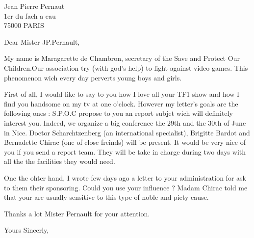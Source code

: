 \documentclass{letter}
\begin{document}
 
\begin{letter}{ Jean Pierre Pernaut \\ 1er du fach a eau  \\ 75000 PARIS}
\opening{Dear Mister JP.Pernault,}



My name is Maragarette de Chambron, secretary of the Save and Protect Our Children.Our association try (with god's help) to fight against video games.
This phenomenon wich every day perverts young boys and girls.

First of all, I would like to say to you how I love all your TF1 show and how I find you handsome on my tv at one o'clock.
However my letter's goals are the following ones : 
S.P.O.C propose to you an report subjet wich will definitely interest you. Indeed, we organize a big conference the 29th and the 30th of June in Nice. 
Doctor Scharchtzenberg (an international specialist), Brigitte Bardot and Bernadette Chirac (one of close freinds) will be present.
It would be very nice of you if you send a report team. They will be take in charge during two days with all the the facilities they would need.

One the ohter hand,  I wrote few days ago a letter to your administration for ask to them their sponsoring.
Could you use your influence ? Madam Chirac told me that your are usually sensitive to this type of noble and piety cause.

Thanks a lot Mister Pernault for your attention.

 
\closing{Yours Sincerly,}
 

 
\end{letter}
 
\end{document}

